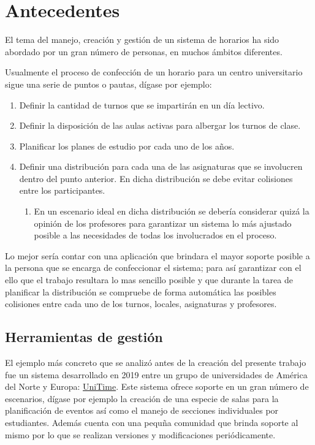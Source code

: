 \chapter{Antecedentes}\label{chapter:state_of_the_art} 

El tema del manejo, creación y gestión de un sistema de horarios ha sido abordado por un gran número de personas, en muchos ámbitos diferentes.

Usualmente el proceso de confección de un horario para un centro universitario sigue una serie de puntos o pautas, dígase por ejemplo:
\begin{enumerate}
	\item Definir la cantidad de turnos que se impartirán en un día lectivo.
	\item Definir la disposición de las aulas activas para albergar los turnos de clase.
	\item Planificar los planes de estudio por cada uno de los años.
	\item Definir una distribución para cada una de las asignaturas que se involucren  dentro del punto anterior. En dicha distribución se debe evitar colisiones entre los participantes.
	\begin{enumerate}
		\item En un escenario ideal en dicha distribución se debería considerar quizá la opinión de los profesores para garantizar un sistema lo más ajustado posible a las necesidades de todas los involucrados en el proceso.
	\end{enumerate}
\end{enumerate}

Lo mejor sería contar con una aplicación que brindara el mayor soporte posible a la persona que se encarga de confeccionar el sistema; para así garantizar con el ello que el trabajo resultara lo mas sencillo posible y que durante la tarea de planificar la distribución se compruebe de forma automática las posibles colisiones entre cada uno de los turnos, locales, asignaturas y profesores.

\section{Herramientas de gestión}
El ejemplo más concreto que se analizó antes de la creación del presente trabajo fue un sistema desarrollado en 2019 entre un grupo de universidades de América del Norte y Europa: \href{https://www.unitime.org/}{UniTime}\cite{UniTime}. Este sistema ofrece soporte en un gran número de escenarios, dígase por ejemplo la creación de una especie de salas para la planificación de eventos así como el manejo de secciones individuales por estudiantes. Además cuenta con una pequña comunidad que brinda soporte al mismo por lo que se realizan versiones y modificaciones periódicamente.

